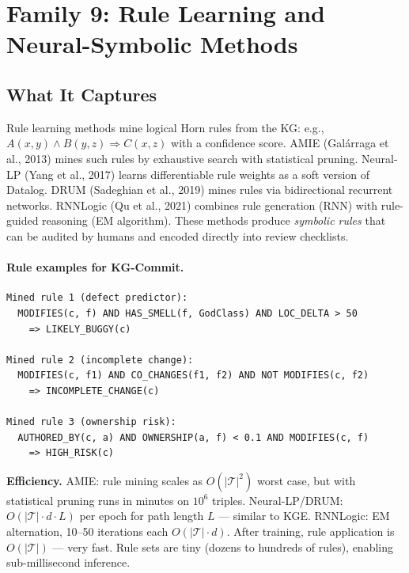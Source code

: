 \documentclass[12pt,a4paper]{article}
\begin{document}
\section{Family 9: Rule Learning and Neural-Symbolic Methods}

\subsection{What It Captures}

Rule learning methods mine logical Horn rules from the KG: e.g.,
$A(x,y) \wedge B(y,z) \Rightarrow C(x,z)$ with a confidence score.
AMIE (Gal\'{a}rraga et al., 2013) mines such rules by exhaustive search with
statistical pruning. Neural-LP (Yang et al., 2017) learns differentiable rule
weights as a soft version of Datalog. DRUM (Sadeghian et al., 2019) mines rules
via bidirectional recurrent networks. RNNLogic (Qu et al., 2021) combines rule
generation (RNN) with rule-guided reasoning (EM algorithm). These methods
produce \emph{symbolic rules} that can be audited by humans and encoded directly
into review checklists.

\paragraph{Rule examples for KG-Commit.}
\begin{lstlisting}
Mined rule 1 (defect predictor):
  MODIFIES(c, f) AND HAS_SMELL(f, GodClass) AND LOC_DELTA > 50
    => LIKELY_BUGGY(c)

Mined rule 2 (incomplete change):
  MODIFIES(c, f1) AND CO_CHANGES(f1, f2) AND NOT MODIFIES(c, f2)
    => INCOMPLETE_CHANGE(c)

Mined rule 3 (ownership risk):
  AUTHORED_BY(c, a) AND OWNERSHIP(a, f) < 0.1 AND MODIFIES(c, f)
    => HIGH_RISK(c)
\end{lstlisting}

\begin{effbox}
\textbf{Efficiency.}
AMIE: rule mining scales as $O(|\mathcal{T}|^2)$ worst case, but with
statistical pruning runs in minutes on $10^6$ triples. Neural-LP/DRUM:
$O(|\mathcal{T}| \cdot d \cdot L)$ per epoch for path length $L$ ---
similar to KGE. RNNLogic: EM alternation, 10--50 iterations each
$O(|\mathcal{T}| \cdot d)$. After training, rule application is
$O(|\mathcal{T}|)$ --- very fast. Rule sets are tiny (dozens to hundreds
of rules), enabling sub-millisecond inference.
\end{effbox}
\end{document}
